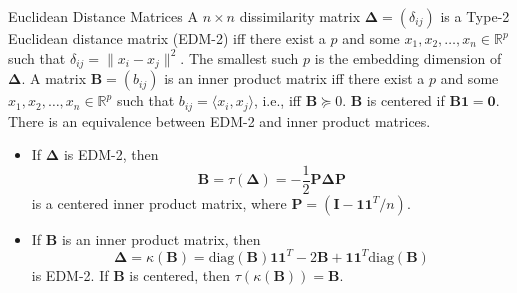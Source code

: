 \documentclass[professionalfonts,hyperref={pdfpagelabels=false,colorlinks=true,linkcolor=red}]{beamer}
\begin{document}
\begin{frame}{Euclidean Distance Matrices}
  A $n \times n$ dissimilarity matrix $\bm{\Delta} =
    (\delta_{ij})$ is a \alert{Type-2 Euclidean distance matrix}
    (EDM-2) iff there exist a $p$ and some $x_1, x_2, \dots, x_n \in
    \mathbb{R}^{p}$ such that $\delta_{ij} = \|x_i - x_j\|^{2}$. The
    smallest such $p$ is the \alert{embedding dimension} of
    $\bm{\Delta}$.  
\vskip10pt A matrix $\mathbf{B} =
    (b_{ij})$ is an inner product matrix iff there exist a $p$ and
    some $x_1, x_2, \dots, x_n \in \mathbb{R}^{p}$ such that $b_{ij} =
    \langle x_i, x_j \rangle$, i.e., iff $\mathbf{B} \succeq
    0$. $\mathbf{B}$ is centered if $\mathbf{B}\bm{1} = \bm{0}$.  
 \vskip10pt There is an equivalence between EDM-2 and
    inner product matrices.
    \begin{itemize}
    \item If $\bm{\Delta}$ is EDM-2, then 
      \begin{equation*}
        \mathbf{B} =
        \tau(\bm{\Delta}) = - \frac{1}{2} \mathbf{P} \bm{\Delta} \mathbf{P}       
      \end{equation*}
      is a centered inner product matrix, where $\mathbf{P} =
      (\mathbf{I} - \bm{1}\bm{1}^{T}/n)$.
    \item If $\bm{B}$ is an inner product matrix, then 
      \begin{equation*}
        \bm{\Delta} =
        \kappa(\mathbf{B}) = \mathrm{diag}(\mathbf{B})\bm{1}\bm{1}^{T} -
        2\mathbf{B} + \bm{1}\bm{1}^{T}\mathrm{diag}(\mathbf{B})       
      \end{equation*}
      is EDM-2. If $\bm{B}$ is centered, then
      $\tau(\kappa(\mathbf{B})) = \mathbf{B}$.
    \end{itemize}
\end{frame}
\end{document}
